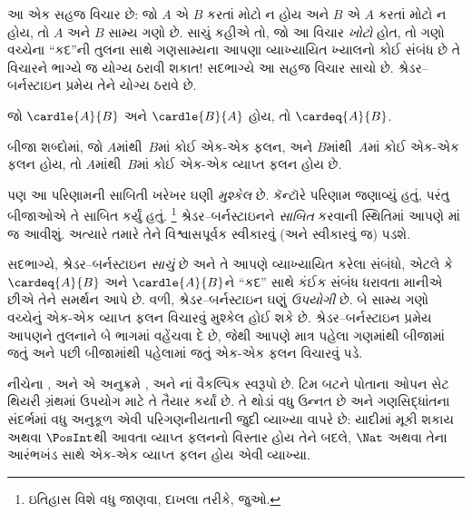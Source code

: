 \begin{explain}
આ એક સહજ વિચાર છે: જો $A$ એ $B$ કરતાં મોટો ન હોય અને $B$ એ
$A$ કરતાં મોટો ન હોય, તો $A$ અને $B$ સામ્ય ગણો છે. સાચું કહીએ તો,
જો આ વિચાર \emph{ખોટો} હોત, તો ગણો વચ્ચેના “કદ”ની તુલના સાથે
ગણસામ્યના આપણા વ્યાખ્યાયિત ખ્યાલનો કોઈ સંબંધ છે તે વિચારને ભાગ્યે જ
યોગ્ય ઠરાવી શકાત!{} સદભાગ્યે આ સહજ વિચાર સાચો છે. શ્રેડર--બર્નસ્ટાઇન
પ્રમેય તેને યોગ્ય ઠરાવે છે.
\end{explain}

\begin{thm}[શ્રેડર--બર્નસ્ટાઇન]
	જો $\cardle{A}{B}$ અને $\cardle{B}{A}$ હોય,
	તો $\cardeq{A}{B}$.
\end{thm}

\begin{explain}
બીજા શબ્દોમાં, જો $A$માંથી~$B$માં કોઈ એક-એક ફલન, અને
$B$માંથી~$A$માં કોઈ એક-એક ફલન હોય, તો $A$માંથી~$B$માં
કોઈ એક-એક વ્યાપ્ત ફલન હોય છે.

પણ આ પરિણામની સાબિતી ખરેખર ઘણી \emph{મુશ્કેલ} છે. કૅન્ટૉરે
પરિણામ જણાવ્યું હતું, પરંતુ બીજાઓએ તે સાબિત કર્યું હતું.
\footnote{ઇતિહાસ વિશે વધુ જાણવા, દાખલા તરીકે,
\citet[pp.~165--6]{Potter2004} જુઓ.}
શ્રેડર--બર્નસ્ટાઇનને
\emph{સાબિત} કરવાની સ્થિતિમાં આપણે
માં જ આવીશું.%
અત્યારે તમારે તેને વિશ્વાસપૂર્વક સ્વીકારવું (અને સ્વીકારવું જ) પડશે.

સદભાગ્યે, શ્રેડર--બર્નસ્ટાઇન \emph{સાચું} છે અને તે આપણે વ્યાખ્યાયિત
કરેલા સંબંધો, એટલે કે $\cardeq{A}{B}$ અને $\cardle{A}{B}$ને “કદ”
સાથે કંઈક સંબંધ ધરાવતા માનીએ છીએ તેને સમર્થન આપે છે. વળી,
શ્રેડર--બર્નસ્ટાઇન ઘણું \emph{ઉપયોગી} છે. બે સામ્ય ગણો વચ્ચેનું
એક-એક વ્યાપ્ત ફલન વિચારવું મુશ્કેલ હોઈ શકે છે. શ્રેડર--બર્નસ્ટાઇન પ્રમેય
આપણને તુલનાને બે ભાગમાં વહેંચવા દે છે, જેથી આપણે માત્ર પહેલા ગણમાંથી
બીજામાં જતું અને પછી બીજામાંથી પહેલામાં જતું એક-એક ફલન વિચારવું પડે.
\end{explain}
\endgroup


\begin{editorial}
નીચેના ,
 અને 
એ અનુક્રમે ,
 અને નાં
વૈકલ્પિક સ્વરૂપો છે. ટિમ બટને પોતાના ઓપન સેટ થિયરી
ગ્રંથમાં ઉપયોગ માટે તે તૈયાર કર્યાં છે. તે થોડાં વધુ
ઉન્નત છે અને ગણસિદ્ધાંતના સંદર્ભમાં વધુ અનુકૂળ એવી
પરિગણનીયતાની જુદી વ્યાખ્યા વાપરે છે: યાદીમાં મૂકી શકાય
અથવા $\PosInt$થી આવતા વ્યાપ્ત ફલનનો વિસ્તાર હોય
તેને બદલે, $\Nat$ અથવા તેના આરંભખંડ સાથે એક-એક
વ્યાપ્ત ફલન હોય એવી વ્યાખ્યા.
\end{editorial}

